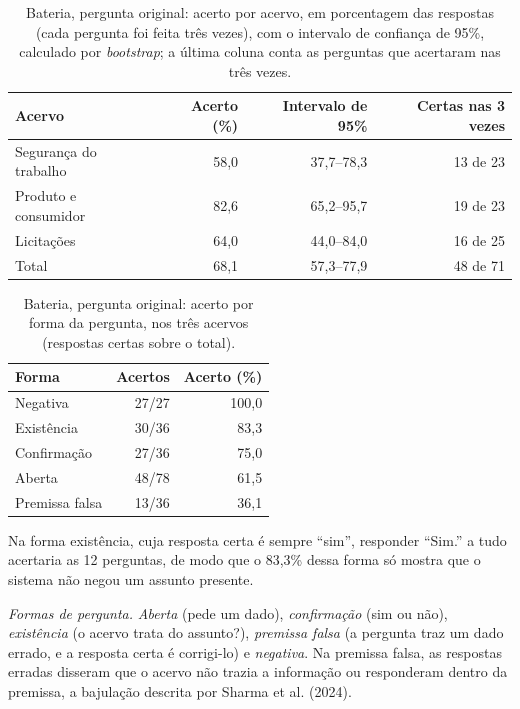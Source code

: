 \documentclass[12pt]{article}
\begin{document}
\begin{table}[!htbp]
\centering
\caption{Bateria, pergunta original: acerto por acervo, em porcentagem das respostas (cada pergunta foi feita três vezes), com o intervalo de confiança de 95\%, calculado por \emph{bootstrap}; a última coluna conta as perguntas que acertaram nas três vezes.}
\label{apoio:bateria-tema}
\begin{tabular}{lrrr}
\toprule
Acervo & Acerto (\%) & Intervalo de 95\% & Certas nas 3 vezes \\
\midrule
Segurança do trabalho & 58,0 & 37,7--78,3 & 13 de 23 \\
Produto e consumidor  & 82,6 & 65,2--95,7 & 19 de 23 \\
Licitações            & 64,0 & 44,0--84,0 & 16 de 25 \\
\midrule
Total                 & 68,1 & 57,3--77,9 & 48 de 71 \\
\bottomrule
\end{tabular}
\end{table}

\begin{table}[!htbp]
\centering
\caption{Bateria, pergunta original: acerto por forma da pergunta, nos três acervos (respostas certas sobre o total).}
\label{apoio:bateria-forma}
\begin{tabular}{lrr}
\toprule
Forma & Acertos & Acerto (\%) \\
\midrule
Negativa       & 27/27 & 100,0 \\
Existência     & 30/36 & 83,3 \\
Confirmação    & 27/36 & 75,0 \\
Aberta         & 48/78 & 61,5 \\
Premissa falsa & 13/36 & 36,1 \\
\bottomrule
\end{tabular}
\end{table}

Na forma existência, cuja resposta certa é sempre ``sim'', responder ``Sim.'' a tudo acertaria as 12 perguntas, de modo que o 83,3\% dessa forma só mostra que o sistema não negou um assunto presente.

\textit{Formas de pergunta.} \emph{Aberta} (pede um dado), \emph{confirmação} (sim ou não), \emph{existência} (o acervo trata do assunto?), \emph{premissa falsa} (a pergunta traz um dado errado, e a resposta certa é corrigi-lo) e \emph{negativa}. Na premissa falsa, as respostas erradas disseram que o acervo não trazia a informação ou responderam dentro da premissa, a bajulação descrita por Sharma et al. (2024).
\end{document}
